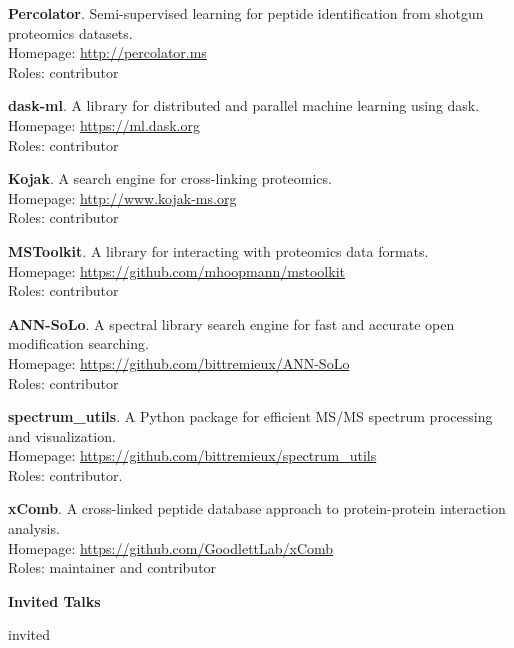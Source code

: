 \documentclass[11pt]{article}
\newcommand{\mysection}[1]{\vspace{1ex} \textbf{\large \textsf{#1} \quad \hrulefill}}
\newcommand{\myref}[1]{\href{#1}{\url{#1}}}
\begin{document}
\begin{etaremune}
  \item \textbf{Percolator}. Semi-supervised learning for peptide
  identification from shotgun proteomics datasets. \\
  Homepage: \myref{http://percolator.ms} \\
  Roles: contributor

  \item \textbf{dask-ml}. A library for distributed and parallel machine
  learning using dask. \\
  Homepage: \myref{https://ml.dask.org} \\
  Roles: contributor

  \item \textbf{Kojak}. A search engine for cross-linking proteomics. \\
  Homepage: \myref{http://www.kojak-ms.org} \\
  Roles: contributor

  \item \textbf{MSToolkit}. A library for interacting with proteomics data formats. \\
  Homepage: \myref{https://github.com/mhoopmann/mstoolkit} \\
  Roles: contributor

  \item \textbf{ANN-SoLo}. A spectral library search engine for fast and
  accurate open modification searching. \\
  Homepage: \myref{https://github.com/bittremieux/ANN-SoLo} \\
  Roles: contributor
   
  \item \textbf{spectrum\_utils}. A Python package for efficient MS/MS spectrum
  processing and visualization. \\
  Homepage: \myref{https://github.com/bittremieux/spectrum_utils} \\
  Roles: contributor.

  \item \textbf{xComb}. A cross-linked peptide database approach to
  protein-protein interaction analysis. \\
  Homepage: \myref{https://github.com/GoodlettLab/xComb} \\
  Roles: maintainer and contributor

\end{etaremune}

\mysection{Invited Talks}
\begin{etaremune}
{{ invited }}
\end{etaremune}
\end{document}
